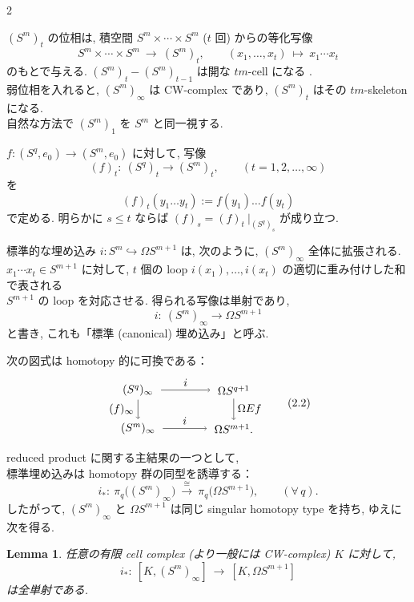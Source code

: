 \documentclass[10pt, leqno]{ltjsarticle} %
\newcommand{\into}{\hookrightarrow}
\numberwithin{equation}{section}
\theoremstyle{plain}
\newtheorem{lemma}[theorem]{Lemma}
\theoremstyle{definition}
\theoremstyle{remark}
\begin{document}
\begin{paracol}{2}

$(S^m)_t$ の位相は,
積空間 $S^m\times\cdots\times S^m$ ($t$ 回) 
からの等化写像
\[
S^m\times\cdots\times S^m \ \longrightarrow\ (S^m)_t,\qquad
(x_1,\ldots,x_t)\ \longmapsto\ x_1\cdots x_t
\]
のもとで与える. 
$(S^m)_t-(S^m)_{t-1}$ は開な $tm$-cell になる .\\ 
弱位相を入れると, $(S^m)_\infty$ は CW-complex であり, 
$(S^m)_t$ はその $tm$-skeleton になる. \\
自然な方法で $(S^m)_1$ を $S^m$ と同一視する. 

$f:(S^q,e_0)\to(S^m,e_0)$ に対して, 写像
\[
(f)_t:\ (S^q)_t\longrightarrow(S^m)_t,\qquad (t=1,2,\ldots,\infty)
\]
を
\[
(f)_t(y_1\ldots y_t):=f(y_1)\ldots f(y_t)
\]
で定める. 明らかに $s\le t$ ならば $(f)_s=(f)_t\ |_{(S^q)_s}$ が成り立つ. 

標準的な埋め込み $i:S^m\into\Omega S^{m+1}$ は,
次のように, 
$(S^m)_\infty$ 全体に拡張される. \\
$x_1\cdots x_t\in S^{m+1}$ 
に対して, 
\(t\) 個の loop $i(x_1),\ldots,i(x_t)$ の適切に重み付けした和で表される\\
\(S^{m+1}\) の loop を対応させる.
得られる写像は単射であり, 
\[
i:\ (S^m)_\infty\longrightarrow\Omega S^{m+1}
\]
と書き, これも「標準 (canonical) 埋め込み」と呼ぶ. 

次の図式は homotopy 的に可換である：
\begin{equation}\label{eq:2.2}
\begin{tikzpicture}[baseline=(current bounding box.center)]
  \node (A) at (0,1.2) {$\ (S^q)_\infty\ $};
  \node (B) at (3,1.2) {$\ \Omega S^{q+1}\ $};
  \node (C) at (0,0)   {$\ (S^m)_\infty\ $};
  \node (D) at (3,0)   {$\ \Omega S^{m+1}.\ $};
  \draw[->] (A) -- node[above] {$i$} (B);
  \draw[->] (C) -- node[above] {$i$} (D);
  \draw[->] (A) -- node[left] {$(f)_\infty$} (C);
  \draw[->] (B) -- node[right] {$\Omega Ef$} (D);
\end{tikzpicture}
\tag{2.2}
\end{equation}

reduced product に関する主結果の一つとして, \\
標準埋め込みは homotopy 群の同型を誘導する：
\[
i_*:\ \pi_q\bigl((S^m)_\infty\bigr)\ \xrightarrow{\;\cong\;}\ 
\pi_q\bigl(\Omega S^{m+1}\bigr),\qquad(\forall\,q).
\]
したがって, 
$(S^m)_\infty$ と $\Omega S^{m+1}$ は同じ singular homotopy type を持ち, 
ゆえに次を得る. 

\begin{lemma}\label{lemma:2.1}
任意の有限 \textnormal{cell complex (より一般には CW-complex)} $K$ に対して,
\[
i_*:\ [K, (S^m)_\infty]\ \longrightarrow\
[K, \Omega S^{m+1}]
\]
は全単射である. 
\end{lemma}

\end{paracol}
\end{document}
